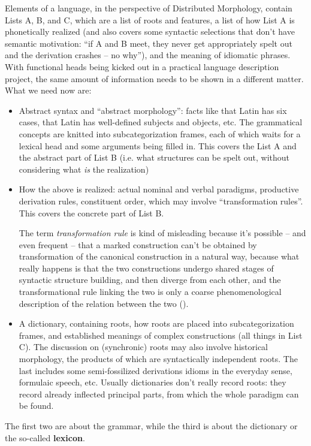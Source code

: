 \documentclass[a4paper, oneside]{report}
\newcommand*{\concept}[1]{\textbf{#1}}
\newcommand*{\term}[1]{\emph{#1}}
\begin{document}
Elements of a language, in the perspective of Distributed Morphology,
contain Lists A, B, and C, 
which are a list of roots and features, 
a list of how List A is phonetically realized 
(and also covers some syntactic selections that don't have semantic motivation: 
``if A and B meet, they never get appropriately spelt out and the derivation crashes -- no why''),
and the meaning of idiomatic phrases. 
With functional heads being kicked out in a practical language description project, 
the same amount of information needs to be shown in a different matter. 
What we need now are: 
\begin{itemize}
    \item Abstract syntax and ``abstract morphology'':
        facts like that Latin has six cases, 
        that Latin has well-defined subjects and objects, etc. 
        The grammatical concepts are knitted into subcategorization frames,
        each of which waits for a lexical head 
        and some arguments being filled in. 
        This covers the List A and the abstract part of List B 
        (i.e. what structures can be spelt out, 
        without considering what \emph{is} the realization)
    \item How the above is realized: 
        actual nominal and verbal paradigms, 
        productive derivation rules, 
        constituent order, which may involve ``transformation rules''.
        This covers 
        the concrete part of List B. 

        The term \term{transformation rule} is kind of misleading 
        because it's possible -- and even frequent -- 
        that a marked construction can't be obtained by transformation 
        of the canonical construction
        in a natural way, 
        because what really happens is 
        that the two constructions undergo shared stages of syntactic structure building,
        and then diverge from each other,
        and the transformational rule linking the two 
        is only a coarse phenomenological description of the relation between the two 
        ().
    \item A dictionary, 
        containing roots, how roots are placed into subcategorization frames, 
        and established meanings of complex constructions (all things in List C). 
        The discussion on (synchronic) roots may also involve 
        historical morphology,
        the products of which are syntactically independent roots.
        The last includes some semi-fossilized derivations 
        idioms in the everyday sense, formulaic speech, etc. 
        Usually dictionaries don't really record roots: 
        they record already inflected principal parts,
        from which the whole paradigm can be found.
\end{itemize}
The first two are about the grammar, 
while the third is about the dictionary
or the so-called \concept{lexicon}.
\end{document}
